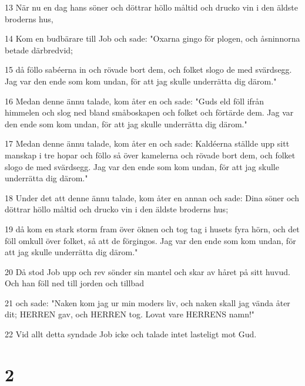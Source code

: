 \par 13 När nu en dag hans söner och döttrar höllo måltid och drucko vin i den äldste broderns hus,
\par 14 Kom en budbärare till Job och sade: "Oxarna gingo för plogen, och åsninnorna betade därbredvid;
\par 15 då föllo sabéerna in och rövade bort dem, och folket slogo de med svärdsegg. Jag var den ende som kom undan, för att jag skulle underrätta dig därom."
\par 16 Medan denne ännu talade, kom åter en och sade: "Guds eld föll ifrån himmelen och slog ned bland småboskapen och folket och förtärde dem. Jag var den ende som kom undan, för att jag skulle underrätta dig därom."
\par 17 Medan denne ännu talade, kom åter en och sade: Kaldéerna ställde upp sitt manskap i tre hopar och föllo så över kamelerna och rövade bort dem, och folket slogo de med svärdsegg. Jag var den ende som kom undan, för att jag skulle underrätta dig därom."
\par 18 Under det att denne ännu talade, kom åter en annan och sade: Dina söner och döttrar höllo måltid och drucko vin i den äldste broderns hus;
\par 19 då kom en stark storm fram över öknen och tog tag i husets fyra hörn, och det föll omkull över folket, så att de förgingos. Jag var den ende som kom undan, för att jag skulle underrätta dig därom."
\par 20 Då stod Job upp och rev sönder sin mantel och skar av håret på sitt huvud. Och han föll ned till jorden och tillbad
\par 21 och sade: "Naken kom jag ur min moders liv, och naken skall jag vända åter dit; HERREN gav, och HERREN tog. Lovat vare HERRENS namn!"
\par 22 Vid allt detta syndade Job icke och talade intet lasteligt mot Gud.

\chapter{2}

